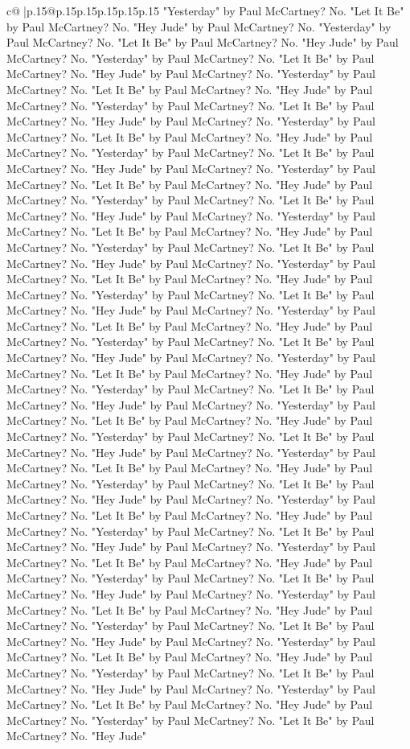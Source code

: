 \documentclass{article}
\begin{document}
{\begin{supertabular}{c@{$\;$}|p{.15\linewidth}@{}p{.15\linewidth}p{.15\linewidth}p{.15\linewidth}p{.15\linewidth}p{.15\linewidth}}
{{{"Yesterday" by Paul McCartney? No. "Let It Be" by Paul McCartney? No. "Hey Jude" by Paul McCartney? No. "Yesterday" by Paul McCartney? No. "Let It Be" by Paul McCartney? No. "Hey Jude" by Paul McCartney? No. "Yesterday" by Paul McCartney? No. "Let It Be" by Paul McCartney? No. "Hey Jude" by Paul McCartney? No. "Yesterday" by Paul McCartney? No. "Let It Be" by Paul McCartney? No. "Hey Jude" by Paul McCartney? No. "Yesterday" by Paul McCartney? No. "Let It Be" by Paul McCartney? No. "Hey Jude" by Paul McCartney? No. "Yesterday" by Paul McCartney? No. "Let It Be" by Paul McCartney? No. "Hey Jude" by Paul McCartney? No. "Yesterday" by Paul McCartney? No. "Let It Be" by Paul McCartney? No. "Hey Jude" by Paul McCartney? No. "Yesterday" by Paul McCartney? No. "Let It Be" by Paul McCartney? No. "Hey Jude" by Paul McCartney? No. "Yesterday" by Paul McCartney? No. "Let It Be" by Paul McCartney? No. "Hey Jude" by Paul McCartney? No. "Yesterday" by Paul McCartney? No. "Let It Be" by Paul McCartney? No. "Hey Jude" by Paul McCartney? No. "Yesterday" by Paul McCartney? No. "Let It Be" by Paul McCartney? No. "Hey Jude" by Paul McCartney? No. "Yesterday" by Paul McCartney? No. "Let It Be" by Paul McCartney? No. "Hey Jude" by Paul McCartney? No. "Yesterday" by Paul McCartney? No. "Let It Be" by Paul McCartney? No. "Hey Jude" by Paul McCartney? No. "Yesterday" by Paul McCartney? No. "Let It Be" by Paul McCartney? No. "Hey Jude" by Paul McCartney? No. "Yesterday" by Paul McCartney? No. "Let It Be" by Paul McCartney? No. "Hey Jude" by Paul McCartney? No. "Yesterday" by Paul McCartney? No. "Let It Be" by Paul McCartney? No. "Hey Jude" by Paul McCartney? No. "Yesterday" by Paul McCartney? No. "Let It Be" by Paul McCartney? No. "Hey Jude" by Paul McCartney? No. "Yesterday" by Paul McCartney? No. "Let It Be" by Paul McCartney? No. "Hey Jude" by Paul McCartney? No. "Yesterday" by Paul McCartney? No. "Let It Be" by Paul McCartney? No. "Hey Jude" by Paul McCartney? No. "Yesterday" by Paul McCartney? No. "Let It Be" by Paul McCartney? No. "Hey Jude" by Paul McCartney? No. "Yesterday" by Paul McCartney? No. "Let It Be" by Paul McCartney? No. "Hey Jude" by Paul McCartney? No. "Yesterday" by Paul McCartney? No. "Let It Be" by Paul McCartney? No. "Hey Jude" by Paul McCartney? No. "Yesterday" by Paul McCartney? No. "Let It Be" by Paul McCartney? No. "Hey Jude" by Paul McCartney? No. "Yesterday" by Paul McCartney? No. "Let It Be" by Paul McCartney? No. "Hey Jude" by Paul McCartney? No. "Yesterday" by Paul McCartney? No. "Let It Be" by Paul McCartney? No. "Hey Jude" by Paul McCartney? No. "Yesterday" by Paul McCartney? No. "Let It Be" by Paul McCartney? No. "Hey Jude" by Paul McCartney? No. "Yesterday" by Paul McCartney? No. "Let It Be" by Paul McCartney? No. "Hey Jude" by Paul McCartney? No. "Yesterday" by Paul McCartney? No. "Let It Be" by Paul McCartney? No. "Hey Jude" by Paul McCartney? No. "Yesterday" by Paul McCartney? No. "Let It Be" by Paul McCartney? No. "Hey Jude" by Paul McCartney? No. "Yesterday" by Paul McCartney? No. "Let It Be" by Paul McCartney? No. "Hey Jude" by Paul McCartney? No. "Yesterday" by Paul McCartney? No. "Let It Be" by Paul McCartney? No. "Hey Jude" }}}
\end{supertabular}}
\end{document}
